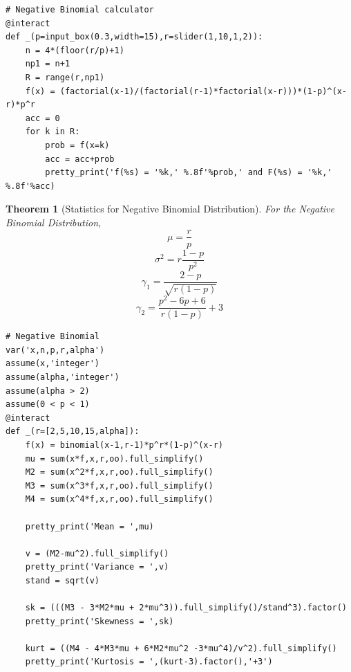 \documentclass[10pt,]{book}
\theoremstyle{plain}
\newtheorem{theorem}{Theorem}[section]
\theoremstyle{definition}
\theoremstyle{definition}
\theoremstyle{definition}
\numberwithin{equation}{section}
\begin{document}
\begin{lstlisting}[style=sageinput]
# Negative Binomial calculator
@interact
def _(p=input_box(0.3,width=15),r=slider(1,10,1,2)):
    n = 4*(floor(r/p)+1)
    np1 = n+1
    R = range(r,np1)
    f(x) = (factorial(x-1)/(factorial(r-1)*factorial(x-r)))*(1-p)^(x-r)*p^r
    acc = 0
    for k in R:
        prob = f(x=k)
        acc = acc+prob
        pretty_print('f(%s) = '%k,' %.8f'%prob,' and F(%s) = '%k,' %.8f'%acc)
\end{lstlisting}

%
\begin{theorem}[{Statistics for Negative Binomial Distribution}]\label{theorem-45}
For the Negative Binomial Distribution, 
		\begin{equation*}\mu = \frac{r}{p}\end{equation*}\begin{equation*}\sigma^2 = r \frac{1-p}{p^2}\end{equation*}\begin{equation*}\gamma_1 = \frac{2-p}{\sqrt{r(1-p)}}\end{equation*}\begin{equation*}\gamma_2 = \frac{p^2-6p+6}{r(1-p)} + 3\end{equation*}\begin{lstlisting}[style=sageinput]
# Negative Binomial
var('x,n,p,r,alpha')
assume(x,'integer')
assume(alpha,'integer')
assume(alpha > 2)
assume(0 < p < 1)
@interact
def _(r=[2,5,10,15,alpha]):
    f(x) = binomial(x-1,r-1)*p^r*(1-p)^(x-r)
    mu = sum(x*f,x,r,oo).full_simplify()
    M2 = sum(x^2*f,x,r,oo).full_simplify()
    M3 = sum(x^3*f,x,r,oo).full_simplify()
    M4 = sum(x^4*f,x,r,oo).full_simplify()
        
    pretty_print('Mean = ',mu)
    
    v = (M2-mu^2).full_simplify()
    pretty_print('Variance = ',v)
    stand = sqrt(v)
    
    sk = (((M3 - 3*M2*mu + 2*mu^3)).full_simplify()/stand^3).factor()
    pretty_print('Skewness = ',sk)
    
    kurt = ((M4 - 4*M3*mu + 6*M2*mu^2 -3*mu^4)/v^2).full_simplify()
    pretty_print('Kurtosis = ',(kurt-3).factor(),'+3')
\end{lstlisting}
\end{theorem}
\typeout{************************************************}
\typeout{************************************************}
\end{document}
